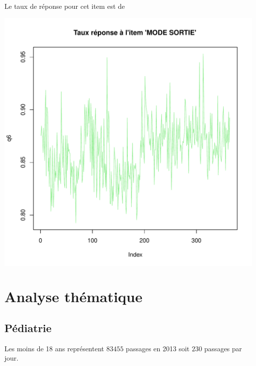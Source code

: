 \documentclass[12pt,english,french,twoside]{book}\usepackage[]{graphicx}\usepackage[]{color}
\makeatletter
\def\maxwidth{ %
  \ifdim\Gin@nat@width>\linewidth
    \linewidth
  \else
    \Gin@nat@width
  \fi
}
\makeatother
\begin{document}
Le taux de réponse pour cet item est de

\includegraphics[width=\maxwidth]{figure/retour_dom3} 




\part{Analyse thématique} 
\newpage

\chapter{Pédiatrie}

\label{chap_pediatrie}




Les moins de 18 ans représentent $83 455$ passages en 2013 soit $230$ passages par jour.

\end{document}
